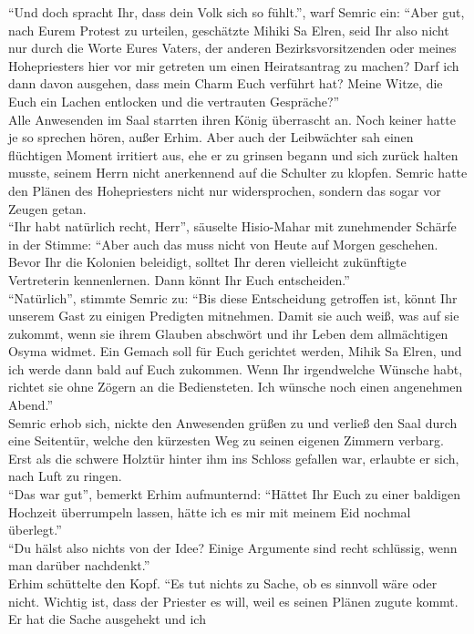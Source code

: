 ``Und doch spracht Ihr, dass dein Volk sich so fühlt.'', warf Semric ein: ``Aber gut, nach Eurem 
Protest zu urteilen, geschätzte Mihiki Sa Elren, seid Ihr also nicht nur durch die Worte Eures 
Vaters, der anderen Bezirksvorsitzenden oder meines Hohepriesters hier vor mir getreten um einen 
Heiratsantrag zu machen? Darf ich dann davon ausgehen, dass mein Charm Euch verführt hat? Meine 
Witze, die Euch ein Lachen entlocken und die vertrauten Gespräche?''\\
Alle Anwesenden im Saal starrten ihren König überrascht an. Noch keiner hatte je so sprechen hören, 
außer Erhim. Aber auch der Leibwächter sah einen flüchtigen Moment irritiert aus, ehe er zu grinsen 
begann und sich zurück halten musste, seinem Herrn nicht anerkennend auf die Schulter zu klopfen. 
Semric hatte den Plänen des Hohepriesters nicht nur widersprochen, sondern das sogar vor Zeugen 
getan.\\
``Ihr habt natürlich recht, Herr'', säuselte Hisio-Mahar mit zunehmender Schärfe in der Stimme: 
``Aber auch das muss nicht von Heute auf Morgen geschehen. Bevor Ihr die Kolonien beleidigt, 
solltet Ihr deren vielleicht zukünftigte Vertreterin kennenlernen. Dann könnt Ihr Euch 
entscheiden.''\\
``Natürlich'', stimmte Semric zu: ``Bis diese Entscheidung getroffen ist, könnt Ihr unserem Gast zu 
einigen Predigten mitnehmen. Damit sie auch weiß, was auf sie zukommt, wenn sie ihrem Glauben 
abschwört und ihr Leben dem allmächtigen Osyma widmet. Ein Gemach soll für Euch gerichtet werden, 
Mihik Sa Elren, und ich werde dann bald auf Euch zukommen. Wenn Ihr irgendwelche Wünsche habt, 
richtet sie ohne Zögern an die Bediensteten. Ich wünsche noch einen angenehmen Abend.''\\
Semric erhob sich, nickte den Anwesenden grüßen zu und verließ den Saal durch eine Seitentür, 
welche den kürzesten Weg zu seinen eigenen Zimmern verbarg. Erst als die schwere Holztür hinter ihm 
ins Schloss gefallen war, erlaubte er sich, nach Luft zu ringen.\\
``Das war gut'', bemerkt Erhim aufmunternd: ``Hättet Ihr Euch zu einer baldigen Hochzeit 
überrumpeln lassen, hätte ich es mir mit meinem Eid nochmal überlegt.''\\
``Du hälst also nichts von der Idee? Einige Argumente sind recht schlüssig, wenn man darüber 
nachdenkt.''\\
Erhim schüttelte den Kopf. ``Es tut nichts zu Sache, ob es sinnvoll wäre oder nicht. Wichtig ist, 
dass der Priester es will, weil es seinen Plänen zugute kommt. Er hat die Sache ausgehekt und ich 

